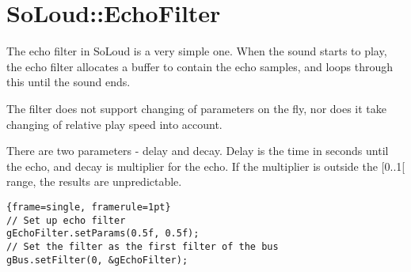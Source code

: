 
\chapter{SoLoud::EchoFilter}

The echo filter in SoLoud is a very simple one. When the sound starts to play, the echo filter allocates a buffer to contain the echo samples, and loops through this until the sound ends.

The filter does not support changing of parameters on the fly, nor does it take changing of relative play speed into account.

There are two parameters - delay and decay. Delay is the time in seconds until the echo, and decay is multiplier for the echo. If the multiplier is outside the [0..1[ range, the results are unpredictable.

\begin{lstlisting}{frame=single, framerule=1pt}
// Set up echo filter
gEchoFilter.setParams(0.5f, 0.5f);  
// Set the filter as the first filter of the bus
gBus.setFilter(0, &gEchoFilter); 
\end{lstlisting}
